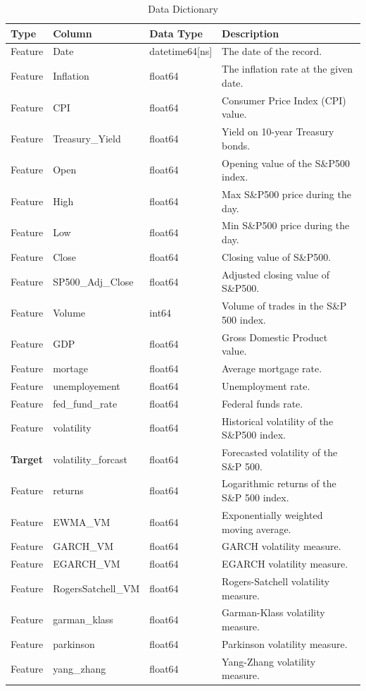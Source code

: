 \documentclass[letterpaper,11pt]{article}
\begin{document}
\begin{table}[ht]
\centering
\caption{Data Dictionary}
\begin{tabular}{|l|l|l|p{7cm}|}
\hline
\textbf{Type} & \textbf{Column} & \textbf{Data Type} & \textbf{Description} \\ \hline
Feature & Date & datetime64[ns] & The date of the record. \\ \hline
Feature & Inflation & float64 & The inflation rate at the given date. \\ \hline
Feature & CPI & float64 & Consumer Price Index (CPI) value. \\ \hline
Feature & Treasury\_Yield & float64 & Yield on 10-year Treasury bonds. \\ \hline
Feature & Open & float64 & Opening value of the S\&P500 index. \\ \hline
Feature & High & float64 & Max S\&P500 price during the day. \\ \hline
Feature & Low & float64 & Min S\&P500 price during the day. \\ \hline
Feature & Close & float64 & Closing value of S\&P500. \\ \hline
Feature & SP500\_Adj\_Close & float64 & Adjusted closing value of S\&P500. \\ \hline
Feature & Volume & int64 & Volume of trades in the S\&P 500 index. \\ \hline
Feature & GDP & float64 & Gross Domestic Product value. \\ \hline
Feature & mortage & float64 & Average mortgage rate. \\ \hline
Feature & unemployement & float64 & Unemployment rate. \\ \hline
Feature & fed\_fund\_rate & float64 & Federal funds rate. \\ \hline
Feature & volatility & float64 & Historical volatility of the S\&P500 index. \\ \hline
\textbf{Target} & volatility\_forcast & float64 & Forecasted volatility of the S\&P 500. \\ \hline
Feature & returns & float64 & Logarithmic returns of the S\&P 500 index. \\ \hline
Feature & EWMA\_VM & float64 & Exponentially weighted moving average. \\ \hline
Feature & GARCH\_VM & float64 & GARCH volatility measure. \\ \hline
Feature & EGARCH\_VM & float64 & EGARCH volatility measure. \\ \hline
Feature & RogersSatchell\_VM & float64 & Rogers-Satchell volatility measure. \\ \hline
Feature & garman\_klass & float64 & Garman-Klass volatility measure. \\ \hline
Feature & parkinson & float64 & Parkinson volatility measure. \\ \hline
Feature & yang\_zhang & float64 & Yang-Zhang volatility measure. \\ \hline
\end{tabular}
\end{table}
\end{document}
